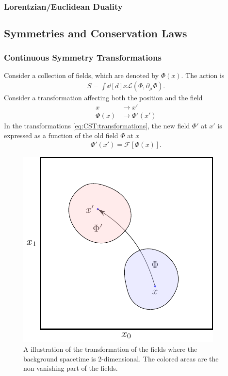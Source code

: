 \documentclass[10pt]{article}
\begin{document}
\subsubsection{Lorentzian/Euclidean Duality}
\subsection{Symmetries and Conservation Laws}
\subsubsection{Continuous Symmetry Transformations}
Consider a collection of fields, which are denoted by $\Phi(x)$.
The action is
\begin{align}
    S=\int\dd[d]{x}\mathcal{L}\left(\Phi,\partial_\mu\Phi\right).
\end{align}
Consider a transformation affecting both the position and the field
\begin{subequations}\label{eq:CST:transformations}
    \begin{align}
        x       & \to x'       \\
        \Phi(x) & \to\Phi'(x')
    \end{align}
\end{subequations}
In the transformations \cref{eq:CST:transformations}, the new field $\Phi'$ at $x'$ is expressed as a function of the old field $\Phi$ at $x$
\begin{align}
    \Phi'(x')=\mathcal{F}\left[\Phi(x)\right].
\end{align}
\begin{figure}[h]
    \centering
    \includegraphics[width=0.5\linewidth]{fig/Quantum Field Theory/transformation_illustration/fig.pdf}
    \caption{A illustration of the transformation of the fields where the background spacetime is 2-dimensional. The colored areas are the non-vanishing part of the fields.}
\end{figure}
\end{document}
